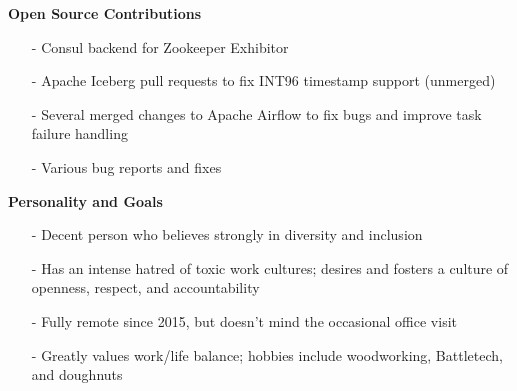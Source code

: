 \documentclass[a4paper,11pt]{article}
\begin{document}
\vspace{0.1in}

\textbf{Open Source Contributions}
\begin{itemize}
    \item[-]Consul backend for Zookeeper Exhibitor
    \item[-]Apache Iceberg pull requests to fix INT96 timestamp support (unmerged)
    \item[-]Several merged changes to Apache Airflow to fix bugs and improve task failure handling
    \item[-]Various bug reports and fixes
\end{itemize}

\vspace{0.1in}
\textbf{Personality and Goals}
\begin{itemize}
    \item[-]Decent person who believes strongly in diversity and inclusion
    \item[-]Has an intense hatred of toxic work cultures; desires and fosters a culture of openness, respect, and accountability
    \item[-]Fully remote since 2015, but doesn't mind the occasional office visit
    \item[-]Greatly values work/life balance; hobbies include woodworking, Battletech, and doughnuts
\end{itemize}
\end{document}
